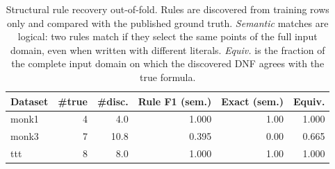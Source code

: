 \begin{table}[t]\centering
\small
\caption{Structural rule recovery out-of-fold. Rules are discovered from training rows only and compared with the published ground truth. \emph{Semantic} matches are logical: two rules match if they select the same points of the full input domain, even when written with different literals. \emph{Equiv.} is the fraction of the complete input domain on which the discovered DNF agrees with the true formula.}
\label{tab:nested-structural}
\begin{tabular}{lrrrrr}
\toprule
Dataset & \#true & \#disc. & Rule F1 (sem.) & Exact (sem.) & Equiv. \\
\midrule
monk1 & 4 & 4.0 & 1.000 & 1.00 & 1.000 \\
monk3 & 7 & 10.8 & 0.395 & 0.00 & 0.665 \\
ttt & 8 & 8.0 & 1.000 & 1.00 & 1.000 \\
\bottomrule
\end{tabular}
\end{table}